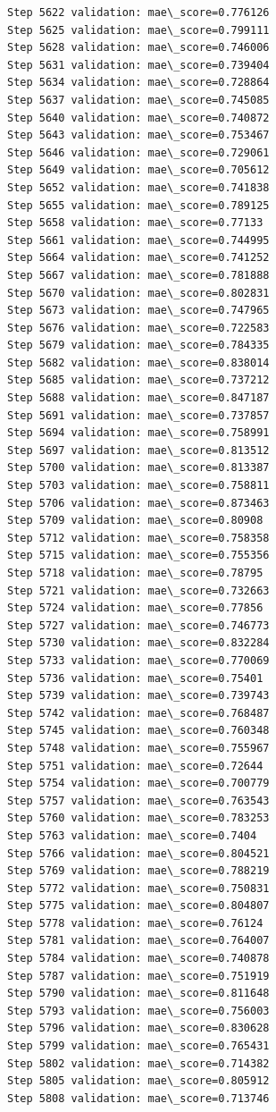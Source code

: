 \documentclass[11pt]{article}
\begin{document}
\begin{Verbatim}[commandchars=\\\{\}]
Step 5622 validation: mae\_score=0.776126
Step 5625 validation: mae\_score=0.799111
Step 5628 validation: mae\_score=0.746006
Step 5631 validation: mae\_score=0.739404
Step 5634 validation: mae\_score=0.728864
Step 5637 validation: mae\_score=0.745085
Step 5640 validation: mae\_score=0.740872
Step 5643 validation: mae\_score=0.753467
Step 5646 validation: mae\_score=0.729061
Step 5649 validation: mae\_score=0.705612
Step 5652 validation: mae\_score=0.741838
Step 5655 validation: mae\_score=0.789125
Step 5658 validation: mae\_score=0.77133
Step 5661 validation: mae\_score=0.744995
Step 5664 validation: mae\_score=0.741252
Step 5667 validation: mae\_score=0.781888
Step 5670 validation: mae\_score=0.802831
Step 5673 validation: mae\_score=0.747965
Step 5676 validation: mae\_score=0.722583
Step 5679 validation: mae\_score=0.784335
Step 5682 validation: mae\_score=0.838014
Step 5685 validation: mae\_score=0.737212
Step 5688 validation: mae\_score=0.847187
Step 5691 validation: mae\_score=0.737857
Step 5694 validation: mae\_score=0.758991
Step 5697 validation: mae\_score=0.813512
Step 5700 validation: mae\_score=0.813387
Step 5703 validation: mae\_score=0.758811
Step 5706 validation: mae\_score=0.873463
Step 5709 validation: mae\_score=0.80908
Step 5712 validation: mae\_score=0.758358
Step 5715 validation: mae\_score=0.755356
Step 5718 validation: mae\_score=0.78795
Step 5721 validation: mae\_score=0.732663
Step 5724 validation: mae\_score=0.77856
Step 5727 validation: mae\_score=0.746773
Step 5730 validation: mae\_score=0.832284
Step 5733 validation: mae\_score=0.770069
Step 5736 validation: mae\_score=0.75401
Step 5739 validation: mae\_score=0.739743
Step 5742 validation: mae\_score=0.768487
Step 5745 validation: mae\_score=0.760348
Step 5748 validation: mae\_score=0.755967
Step 5751 validation: mae\_score=0.72644
Step 5754 validation: mae\_score=0.700779
Step 5757 validation: mae\_score=0.763543
Step 5760 validation: mae\_score=0.783253
Step 5763 validation: mae\_score=0.7404
Step 5766 validation: mae\_score=0.804521
Step 5769 validation: mae\_score=0.788219
Step 5772 validation: mae\_score=0.750831
Step 5775 validation: mae\_score=0.804807
Step 5778 validation: mae\_score=0.76124
Step 5781 validation: mae\_score=0.764007
Step 5784 validation: mae\_score=0.740878
Step 5787 validation: mae\_score=0.751919
Step 5790 validation: mae\_score=0.811648
Step 5793 validation: mae\_score=0.756003
Step 5796 validation: mae\_score=0.830628
Step 5799 validation: mae\_score=0.765431
Step 5802 validation: mae\_score=0.714382
Step 5805 validation: mae\_score=0.805912
Step 5808 validation: mae\_score=0.713746

\end{Verbatim}
\end{document}
